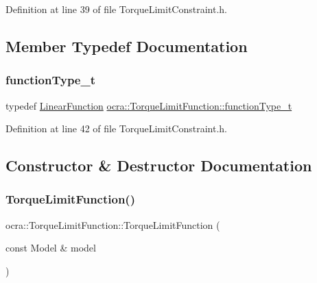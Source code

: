 Definition at line 39 of file Torque\+Limit\+Constraint.\+h.



\subsection{Member Typedef Documentation}
\hypertarget{classocra_1_1TorqueLimitFunction_a0c9d97d4e11ee173ae359698d6c95b25}{}\label{classocra_1_1TorqueLimitFunction_a0c9d97d4e11ee173ae359698d6c95b25} 
\subsubsection{\texorpdfstring{function\+Type\+\_\+t}{functionType\_t}}
{\footnotesize\ttfamily typedef \hyperlink{classocra_1_1LinearFunction}{Linear\+Function} \hyperlink{classocra_1_1TorqueLimitFunction_a0c9d97d4e11ee173ae359698d6c95b25}{ocra\+::\+Torque\+Limit\+Function\+::function\+Type\+\_\+t}}



Definition at line 42 of file Torque\+Limit\+Constraint.\+h.



\subsection{Constructor \& Destructor Documentation}
\hypertarget{classocra_1_1TorqueLimitFunction_a3ca04338256c4a0bf484f29dc7aeb06d}{}\label{classocra_1_1TorqueLimitFunction_a3ca04338256c4a0bf484f29dc7aeb06d} 
\subsubsection{\texorpdfstring{Torque\+Limit\+Function()}{TorqueLimitFunction()}}
{\footnotesize\ttfamily ocra\+::\+Torque\+Limit\+Function\+::\+Torque\+Limit\+Function (\begin{DoxyParamCaption}\item[{const Model \&}]{model }\end{DoxyParamCaption})}


